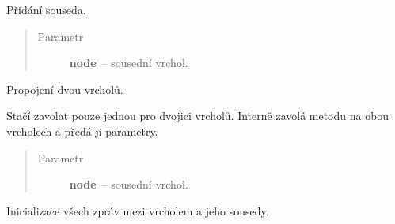 \begin{fulllineitems}
\begin{fulllineitems}
\end{fulllineitems}


\begin{fulllineitems}
\label{alex.infer:alex.infer.factor.alex.infer.node.DiscreteVariableNode.add_neighbor}
Přidání souseda.
\begin{quote}\begin{description}
\item[{Parametr}] \leavevmode
\textbf{node}~-- sousední vrchol.

\end{description}\end{quote}

\end{fulllineitems}


\begin{fulllineitems}
\label{alex.infer:alex.infer.factor.alex.infer.node.DiscreteVariableNode.connect}
Propojení dvou vrcholů.

Stačí zavolat pouze jednou pro dvojici vrcholů.
Interně zavolá metodu {\hyperref[alex.infer:alex.infer.factor.alex.infer.node.DiscreteVariableNode.add_neighbor]{}} na obou vrcholech a předá ji parametry.
\begin{quote}\begin{description}
\item[{Parametr}] \leavevmode
\textbf{node}~-- sousední vrchol.

\end{description}\end{quote}

\end{fulllineitems}


\begin{fulllineitems}
\label{alex.infer:alex.infer.factor.alex.infer.node.DiscreteVariableNode.init_messages}
Inicializace všech zpráv mezi vrcholem a jeho sousedy.

\end{fulllineitems}


\end{fulllineitems}
